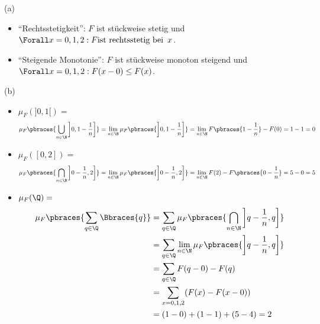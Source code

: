 \begin{solution}

(a)

\begin{itemize}

  \item \enquote{Rechtsstetigkeit}: $F$ ist stückweise stetig und $\Forall x = 0, 1, 2: F \text{ist rechtsstetig bei} \enspace x$.

  \item \enquote{Steigende Monotonie}: $F$ ist stückweise monoton steigend und $\Forall x = 0, 1, 2: F(x - 0) \leq F(x)$.

\end{itemize}

(b)

\begin{itemize}

  \item $\mu_F(]0, 1[) =$
  \begin{align*}
    \mu_F \pbraces{\bigcup_{n \in \N} \left ] 0, 1 - \frac{1}{n} \right ]}
    =
    \lim_{n \in \N} \mu_F \pbraces{\left ] 0, 1 - \frac{1}{n} \right ]}
    =
    \lim_{n \in \N} F \pbraces{1 - \frac{1}{n}} - F(0)
    = 1 - 1 = 0
  \end{align*}

  \item $\mu_F([0, 2]) =$
  \begin{align*}
    \mu_F \pbraces{\bigcap_{n \in \N} \left ] 0 - \frac{1}{n}, 2 \right ]}
    =
    \lim_{n \in \N} \mu_F \pbraces{\left ] 0 - \frac{1}{n}, 2 \right ]}
    =
    \lim_{n \in \N} F(2) - F \pbraces{0 - \frac{1}{n}}
    =
    5 - 0 = 5
  \end{align*}

  \item $\mu_F(\Q) =$
  \begin{align*}
    \mu_F \pbraces{\sum_{q \in \Q} \Bbraces{q}}
    & =
    \sum_{q \in \Q} \mu_F \pbraces
    {\bigcap_{n \in \N} \left ] q - \frac{1}{n}, q \right ]} \\
    & =
    \sum_{q \in \Q} \lim_{n \in \N} \mu_F \pbraces
    {\left ] q - \frac{1}{n}, q \right ]} \\
    & =
    \sum_{q \in \Q} F(q - 0) - F(q) \\
    & =
    \sum_{x = 0, 1, 2} (F(x) - F(x - 0)) \\
    & =
    (1 - 0) + (1 - 1) + (5 - 4) = 2
  \end{align*}

\end{itemize}


\end{solution}
